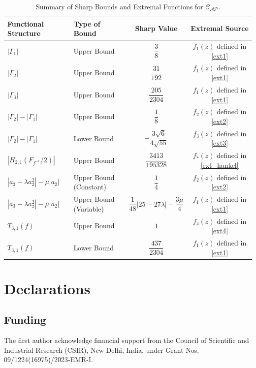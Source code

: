 \documentclass[11pt]{article}
\numberwithin{equation}{section}
\begin{document}
\begin{table}[H]
\centering
\caption{Summary of Sharp Bounds and Extremal Functions for $\mathcal{C}_{\mathcal{AP}}$.}
\label{tab:extremal_summary}
\small
\addtolength{\tabcolsep}{4pt} 
\renewcommand{\arraystretch}{1.5} 
\begin{tabular}{llcc}
\toprule
\textbf{Functional Structure} & \textbf{Type of Bound} & \textbf{Sharp Value} & \textbf{Extremal Source} \\ \midrule
$|\Gamma_1|$ & Upper Bound & $\dfrac{3}{8}$ & $f_1(z)$ defined in \eqref{ext1} \\[2mm]
$|\Gamma_2|$ & Upper Bound & $\dfrac{31}{192}$ & $f_1(z)$ defined in \eqref{ext1} \\[2mm]
$|\Gamma_3|$ & Upper Bound & $\dfrac{205}{2304}$ & $f_1(z)$ defined in \eqref{ext1} \\[2mm]
$|\Gamma_2| - |\Gamma_1|$ & Upper Bound & $\dfrac{1}{8}$ & $f_2(z)$ defined in \eqref{ext2} \\[2mm]
$|\Gamma_2| - |\Gamma_1|$ & Lower Bound & $-\dfrac{3\sqrt{6}}{4\sqrt{55}}$ & $f_3(z)$ defined in \eqref{ext3} \\[2mm]
$\left| H_{2,1}\left(F_{f^{-1}} / 2\right)\right|$ & Upper Bound & $\dfrac{3413}{195328}$ & $f_*(z)$ defined in \eqref{ext_hankel} \\[2mm]
$|a_3 - \lambda a_2^2| - \mu |a_2|$ & Upper Bound (Constant) & $\dfrac{1}{4}$ & $f_2(z)$ defined in \eqref{ext2} \\[2mm]
$|a_3 - \lambda a_2^2| - \mu |a_2|$ & Upper Bound (Variable) & $\dfrac{1}{48} |25 - 27\lambda| - \dfrac{3\mu}{4}$ & $f_1(z)$ defined in \eqref{ext1} \\[2mm]
$T_{3,1}(f)$ & Upper Bound & $1$ & $f_4(z)$ defined in \eqref{ext4} \\[2mm]
$T_{3,1}(f)$ & Lower Bound & $\dfrac{437}{2304}$ & $f_1(z)$ defined in \eqref{ext1} \\ \bottomrule
\end{tabular}
\end{table}

\section*{Declarations}
\subsection*{Funding}
The first author acknowledge financial support from the Council of Scientific and Industrial Research (CSIR), New Delhi, India, under Grant Nos. 09/1224(16975)/2023-EMR-I.
\end{document}
